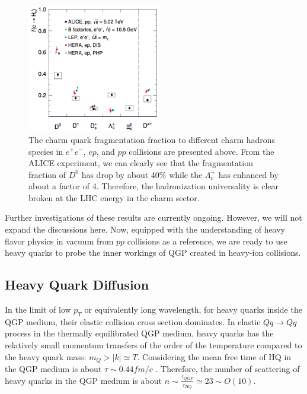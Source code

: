  \begin{figure}[hbtp]
\begin{center}
\includegraphics[width=0.52\textwidth]{Figures/Chapter1/ALICECharmFF.png}
\caption{The charm quark fragmentation fraction to different charm hadrons species in $e^+e^-$, $ep$, and $pp$ collisions are presented above. From the ALICE experiment, we can clearly see that the fragmentation fraction of $D^0$ has drop by about 40\% while the $\Lambda_c^+$ has enhanced by about a factor of 4. Therefore, the hadronization universality is clear broken at the LHC energy in the charm sector.}
\label{CharmFFALICE}
\end{center}
\end{figure}   

Further investigations of these results are currently ongoing. However, we will not expand the discussions here. Now, equipped with the understanding of heavy flavor physics in vacuum from $pp$ collisions as a reference, we are ready to use heavy quarks to probe the inner workings of QGP created in heavy-ion collisions. 

\subsection{Heavy Quark Diffusion}

In the limit of low $p_T$ or equivalently long wavelength, for heavy quarks inside the QGP medium, their elastic collision cross section dominates. In elastic $Q q \rightarrow Q q$ process in the thermally equilibrated QGP medium, heavy quarks has the relatively small momentum transfers of the order of the temperature compared to the heavy quark mass: $m_Q > |k| \simeq T$. Considering the mean free time of HQ in the QGP medium is about $\tau \sim 0.44 fm/c$ \cite{HQTau}. Therefore, the number of scattering of heavy quarks in the QGP medium is about $n \sim \frac{\tau_{QGP}}{\tau_{HQ}} \simeq 23 \sim O(10)$.

